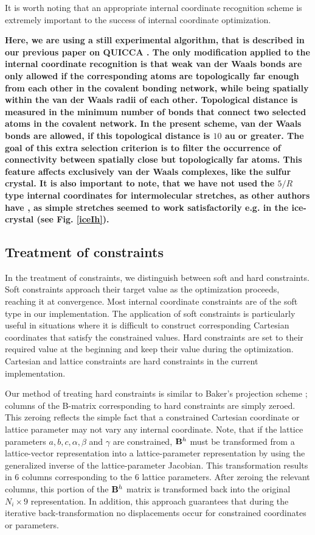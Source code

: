 \twolinestyle{\documentclass[prb,preprint]{revtex4}}
\begin{document}
It is worth noting that an appropriate internal coordinate 
recognition scheme is extremely important to the success of internal 
coordinate optimization.  
{\bf Here, we are using a still experimental algorithm, that is described
in our previous paper on QUICCA \cite{KNemeth04}. The only modification
applied to the internal coordinate recognition is that
weak van der Waals bonds are only allowed if the corresponding atoms
are topologically far enough from each other 
in the covalent bonding
network, while being spatially within the van der Waals radii of 
each other. Topological distance is measured in the minimum number
of bonds that connect two selected atoms in the covalent network.
In the present scheme, van der Waals bonds are allowed, if this 
topological distance is $10$ au or greater.
The goal
of this extra selection criterion is to filter the occurrence of
connectivity between spatially close but topologically far atoms.
This feature affects exclusively van der Waals complexes, like the sulfur crystal. 
It is also important to note, that we have not used the $5/R$ type
internal coordinates for intermolecular stretches, as other authors have \cite{JBaker00,TBucko05},
as simple stretches seemed to work satisfactorily e.g. in the ice-crystal (see Fig. \ref{iceIh}). 

}

\subsection{Treatment of constraints}

In the treatment of  constraints, we distinguish between soft and hard constraints.
Soft constraints approach their target value as the optimization proceeds,  reaching it at 
convergence.  Most internal coordinate constraints are of the soft type in our implementation. 
The application of soft constraints is particularly useful in situations where it is difficult
to construct corresponding Cartesian coordinates that satisfy the constrained values.
Hard constraints are set to their required value  at the beginning and keep their value during 
the optimization.  Cartesian  and lattice constraints are hard constraints in the current 
implementation. 

Our method of treating hard constraints is similar to Baker's projection scheme \cite{JBaker96};  
columns of the B-matrix corresponding to hard constraints are simply zeroed. 
This zeroing reflects the simple fact that a constrained Cartesian coordinate or
lattice parameter may not vary any internal coordinate.
Note, that if the lattice parameters $a, b, c, \alpha, \beta$ and $\gamma$ are constrained, 
${\bf B}^h$ must be transformed from a lattice-vector representation into a lattice-parameter 
representation by using the generalized inverse of the lattice-parameter Jacobian. 
This transformation results in 6 columns corresponding to the 6 lattice parameters. 
After zeroing the relevant columns, this portion of the ${\bf B}^h$ matrix is transformed back 
into the original $N_i \times 9$ representation.   In addition, this approach
guarantees that during the iterative back-transformation no displacements occur 
for constrained coordinates or parameters.
\end{document}
